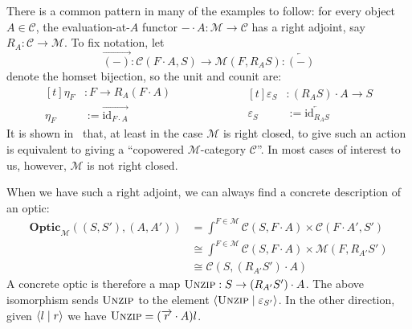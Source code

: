 \documentclass[11pt,letterpaper]{article}
\theoremstyle{plain}
\theoremstyle{definition}
\newcommand{\C}{\mathscr{C}}
\newcommand{\M}{\mathscr{M}}
\newcommand{\Optic}{\mathbf{Optic}}
\newcommand{\id}{\mathrm{id}}
\newcommand{\act}{\cdot}
\newcommand{\rep}[2]{{\ensuremath \left\langle #1 \mid #2 \right\rangle}}
\newcommand{\funzip}{\textsc{Unzip}}
\newcommand{\todo}[1]{\textcolor{red}{\small #1}}
\begin{document}
There is a common pattern in many of the examples to follow: for every object $A \in \C$, the evaluation-at-$A$ functor $- \act A : \M \to \C$ has a right adjoint, say $R_A : \C \to \M$. To fix notation, let \[\overrightarrow{(-)} : \C(F \act A, S) \to \M(F, R_{A} S) : \overleftarrow{(-)}\] denote the homset bijection, so the unit and counit are:
    \begin{equation*}
    \begin{aligned}[t]
  	\eta_F &: F \to R_A (F \act A) \\
    \eta_F &:= \overrightarrow{\id_{F \act A}}
    \end{aligned}
    \qquad\qquad\qquad
    \begin{aligned}[t]
    \varepsilon_{S} &: (R_A S) \act A \to S \\
    \varepsilon_{S} &:= \overleftarrow{\id_{R_{A} S}}
    \end{aligned}
\end{equation*}
It is shown in~\cite[Section 6]{ANoteOnActions} that, at least in the case $\M$ is right closed, to give such an action is equivalent to giving a ``copowered $\M$-category $\C$''. In most cases of interest to us, however, $\M$ is not right closed. %

When we have such a right adjoint, we can always find a concrete description of an optic:
\begin{align*}
\Optic_\M((S, S'), (A, A')) &= \int^{F \in \M} \C(S, F\act A) \times \C(F\act A', S') \\
&\cong \int^{F \in \M} \C(S, F \act A) \times \M(F, R_{A'} S') \\
&\cong \C(S,  (R_{A'} S') \act A)
\end{align*}
A concrete optic is therefore a map $\funzip : S \to (R_{A'} S') \act A$. The above isomorphism sends $\funzip$ to the element $\rep{\funzip}{\varepsilon_{S'}}$. In the other direction, given $\rep{l}{r}$ we have $\funzip = (\overrightarrow{r} \act A)l$.
\end{document}
